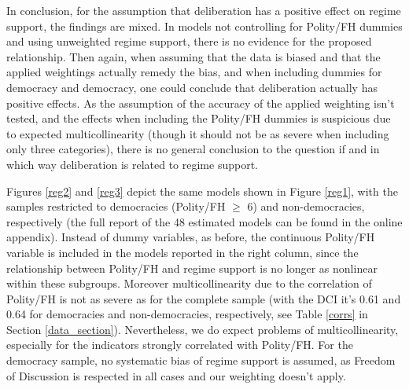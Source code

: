 \documentclass[]{article}
\begin{document}
In conclusion, for the assumption that deliberation has a positive
effect on regime support, the findings are mixed. In models not
controlling for Polity/FH dummies and using unweighted regime support,
there is no evidence for the proposed relationship. Then again, when
assuming that the data is biased and that the applied weightings
actually remedy the bias, and when including dummies for democracy and
democracy, one could conclude that deliberation actually has positive
effects. As the assumption of the accuracy of the applied weighting
isn't tested, and the effects when including the Polity/FH dummies is
suspicious due to expected multicollinearity (though it should not be as
severe when including only three categories), there is no general
conclusion to the question if and in which way deliberation is related
to regime support.

Figures \ref{reg2} and \ref{reg3} depict the same models shown in Figure
\ref{reg1}, with the samples restricted to democracies (Polity/FH
\(\ge\) 6) and non-democracies, respectively (the full report of the 48
estimated models can be found in the online appendix). Instead of dummy
variables, as before, the continuous Polity/FH variable is included in
the models reported in the right column, since the relationship between
Polity/FH and regime support is no longer as nonlinear within these
subgroups. Moreover multicollinearity due to the correlation of
Polity/FH is not as severe as for the complete sample (with the DCI it's
0.61 and 0.64 for democracies and non-democracies, respectively, see
Table \ref{corrs} in Section \ref{data_section}). Nevertheless, we do
expect problems of multicollinearity, especially for the indicators
strongly correlated with Polity/FH. For the democracy sample, no
systematic bias of regime support is assumed, as Freedom of Discussion
is respected in all cases and our weighting doesn't apply.
\end{document}
